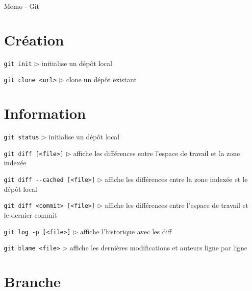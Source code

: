 \documentclass[a4paper,oneside,twocolumn]{article}
\begin{document}
\begin{center}
	\huge Memo - Git
\end{center}


\vspace{-3mm}
\section{Création}
\vspace{-2mm}

\noindent\verb?git init?\linebreak
$\triangleright$ initialise un dépôt local

\noindent\verb?git clone <url>?\linebreak
$\triangleright$ clone un dépôt existant

\vspace{-3mm}
\section{Information}
\vspace{-2mm}

\noindent\verb?git status?\linebreak
$\triangleright$ initialise un dépôt local

\noindent\verb?git diff [<file>]?\linebreak
$\triangleright$ affiche les différences entre l'espace de travail et la zone indexée

\noindent\verb?git diff --cached [<file>]?\linebreak
$\triangleright$ affiche les différences entre la zone indexée et le dépôt local

\noindent\verb?git diff <commit> [<file>]?\linebreak
$\triangleright$ affiche les différences entre l'espace de travail et le dernier commit

\noindent\verb?git log -p [<file>]?\linebreak
$\triangleright$ affiche l'historique avec les diff

\noindent\verb?git blame <file>?\linebreak
$\triangleright$ affiche les dernières modifications et auteurs ligne par ligne

\vspace{-3mm}
\section{Branche}
\vspace{-2mm}
\end{document}
